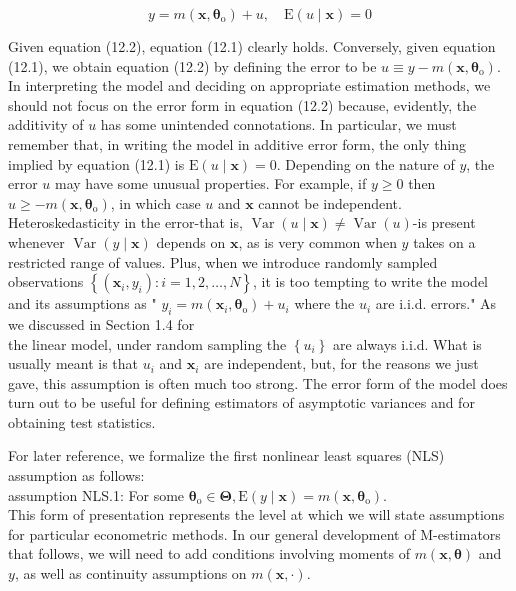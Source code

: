 \documentclass[10pt]{article}
\begin{document}
\begin{equation*}
y=m\left(\mathbf{x}, \boldsymbol{\theta}_{\mathrm{o}}\right)+u, \quad \mathrm{E}(u \mid \mathbf{x})=0 \tag{12.2}
\end{equation*}


Given equation (12.2), equation (12.1) clearly holds. Conversely, given equation (12.1), we obtain equation (12.2) by defining the error to be $u \equiv y-m\left(\mathbf{x}, \boldsymbol{\theta}_{\mathrm{o}}\right)$. In interpreting the model and deciding on appropriate estimation methods, we should not focus on the error form in equation (12.2) because, evidently, the additivity of $u$ has some unintended connotations. In particular, we must remember that, in writing the model in additive error form, the only thing implied by equation (12.1) is $\mathrm{E}(u \mid \mathbf{x})=0$. Depending on the nature of $y$, the error $u$ may have some unusual properties. For example, if $y \geq 0$ then $u \geq-m\left(\mathbf{x}, \boldsymbol{\theta}_{\mathrm{o}}\right)$, in which case $u$ and $\mathbf{x}$ cannot be independent. Heteroskedasticity in the error-that is, $\operatorname{Var}(u \mid \mathbf{x}) \neq \operatorname{Var}(u)$-is present whenever $\operatorname{Var}(y \mid \mathbf{x})$ depends on $\mathbf{x}$, as is very common when $y$ takes on a restricted range of values. Plus, when we introduce randomly sampled observations $\left\{\left(\mathbf{x}_{i}, y_{i}\right): i=1,2, \ldots, N\right\}$, it is too tempting to write the model and its assumptions as " $y_{i}=m\left(\mathbf{x}_{i}, \boldsymbol{\theta}_{\mathrm{o}}\right)+u_{i}$ where the $u_{i}$ are i.i.d. errors." As we discussed in Section 1.4 for\\
the linear model, under random sampling the $\left\{u_{i}\right\}$ are always i.i.d. What is usually meant is that $u_{i}$ and $\mathbf{x}_{i}$ are independent, but, for the reasons we just gave, this assumption is often much too strong. The error form of the model does turn out to be useful for defining estimators of asymptotic variances and for obtaining test statistics.

For later reference, we formalize the first nonlinear least squares (NLS) assumption as follows:\\
assumption NLS.1: For some $\boldsymbol{\theta}_{\mathrm{o}} \in \boldsymbol{\Theta}, \mathrm{E}(y \mid \mathbf{x})=m\left(\mathbf{x}, \boldsymbol{\theta}_{\mathrm{o}}\right)$.\\
This form of presentation represents the level at which we will state assumptions for particular econometric methods. In our general development of M-estimators that follows, we will need to add conditions involving moments of $m(\mathbf{x}, \boldsymbol{\theta})$ and $y$, as well as continuity assumptions on $m(\mathbf{x}, \cdot)$.
\end{document}
